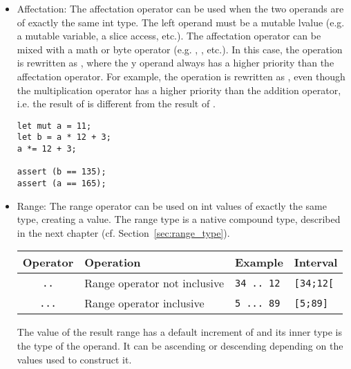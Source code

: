 \begin{itemize}
\item Affectation: The affectation operator \token{=} can be used when the two
  operands are of exactly the same int type. The left operand must be a mutable
  lvalue (e.g. a mutable variable, a slice access, etc.). The affectation
  operator can be mixed with a math or byte operator (e.g. \token{+=},
  \token{\&=}, etc.). In this case, the operation  is rewritten
  as , where the y operand always has a higher priority than
  the affectation operator. For example, the operation  is
  rewritten as , even though the multiplication
  operator has a higher priority than the addition operator, i.e. the result of
   is different from the result of .

  \begin{lstlisting}[style=coloredverbatim]
let mut a = 11;
let b = a * 12 + 3;
a *= 12 + 3;

assert (b == 135);
assert (a == 165);
  \end{lstlisting}

\item Range: The range operator can be used on int values of exactly the same
  type, creating a  value. The range type is a native compound
  type, described in the next chapter (cf. Section~\ref{sec:range_type}).

  \begin{center}
    \vspace{-10pt}
    \begin{adjustbox}{max width=1.0\linewidth}
      \begin{tabular}{|c|lll|}
        \hline
        Operator & Operation & Example & Interval\\[0pt]
        \hline
        \texttt{..} & Range operator not inclusive & \texttt{34 .. 12} & \texttt{[34;12[}\\[0pt]
            \texttt{...} & Range operator inclusive & \texttt{5 ... 89} & \texttt{[5;89]}\\[0pt]
            \hline
      \end{tabular}
    \end{adjustbox}
  \end{center}

The value of the result range has a default increment of  and its
inner type is the type of the operand. It can be ascending or descending
depending on the values used to construct it.

\end{itemize}

